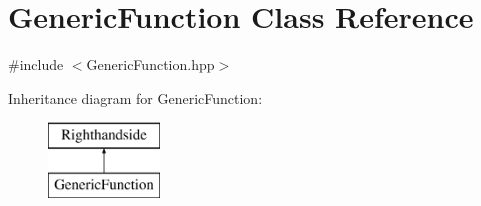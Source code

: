 \hypertarget{class_generic_function}{}\section{Generic\+Function Class Reference}
\label{class_generic_function}


{\ttfamily \#include $<$Generic\+Function.\+hpp$>$}

Inheritance diagram for Generic\+Function\+:\begin{figure}[H]
\begin{center}
\leavevmode
\includegraphics[height=2.000000cm]{class_generic_function}
\end{center}
\end{figure}
